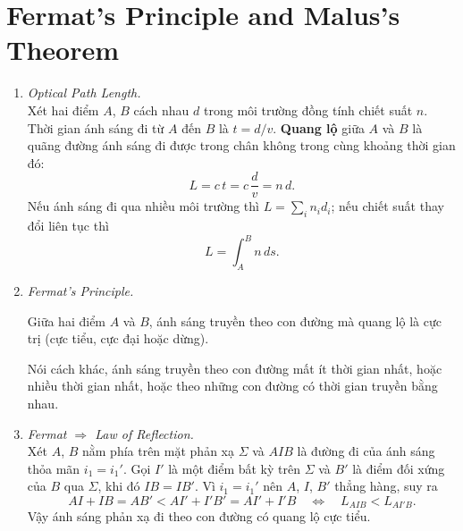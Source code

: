 \section{Fermat's Principle and Malus's Theorem}
\begin{enumerate}
\item \textit{Optical Path Length.}\\
Xét hai điểm $A$, $B$ cách nhau $d$ trong môi trường đồng tính chiết suất $n$. Thời gian ánh sáng đi từ $A$ đến $B$ là $t = d/v$. \textbf{Quang lộ} giữa $A$ và $B$ là quãng đường ánh sáng đi được trong chân không trong cùng khoảng thời gian đó:
\[
L = c\,t = c\,\frac{d}{v} = n\,d.
\]
Nếu ánh sáng đi qua nhiều môi trường thì $L = \sum_i n_i d_i$; nếu chiết suất thay đổi liên tục thì
\[
L = \int_A^B n\,ds.
\]

\item \textit{Fermat's Principle.}\\
\begin{theorem}[Fermat]
Giữa hai điểm $A$ và $B$, ánh sáng truyền theo con đường mà quang lộ là cực trị (cực tiểu, cực đại hoặc dừng).
\end{theorem}
Nói cách khác, ánh sáng truyền theo con đường mất ít thời gian nhất, hoặc nhiều thời gian nhất, hoặc theo những con đường có thời gian truyền bằng nhau.

\item \textit{Fermat $\Rightarrow$ Law of Reflection.}\\
Xét $A$, $B$ nằm phía trên mặt phản xạ $\Sigma$ và $AIB$ là đường đi của ánh sáng thỏa mãn $i_1 = i_1'$. Gọi $I'$ là một điểm bất kỳ trên $\Sigma$ và $B'$ là điểm đối xứng của $B$ qua $\Sigma$, khi đó $IB = IB'$. Vì $i_1 = i_1'$ nên $A$, $I$, $B'$ thẳng hàng, suy ra
\[
AI + IB = AB' < AI' + I'B' = AI' + I'B
\quad\Leftrightarrow\quad
L_{AIB} < L_{AI'B}.
\]
Vậy ánh sáng phản xạ đi theo con đường có quang lộ cực tiểu.


\end{enumerate}
